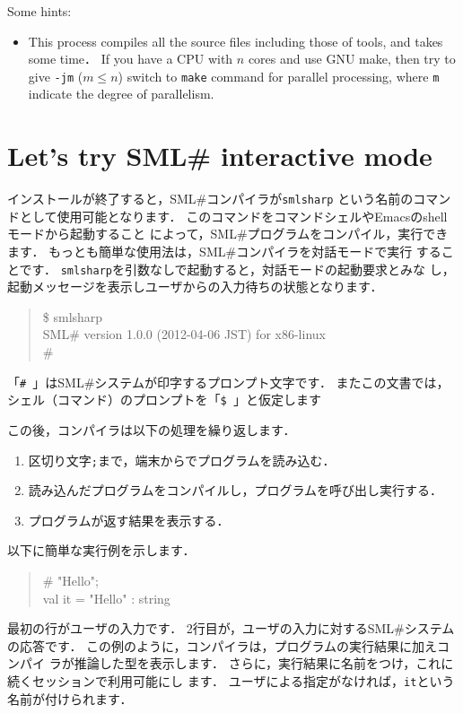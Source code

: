 \documentclass{jbook}
\newcommand{\txt}[2]{#2}
\newcommand{\smlsharp}{SML\#}
\begin{document}
Some hints:
\begin{itemize}
\item 
	This process compiles all the source files including those of
tools, and takes some time．
	If you have a CPU with $n$ cores and use GNU make, then try to
give {\tt -jm} ($m \le n$) switch to {\tt make} command for
parallel processing, where {\tt m} indicate the degree of parallelism. 
\end{itemize}
\fi%

\section{
\txt{\smlsharp{}の対話型モードを使ってみよう}
    {Let's try \smlsharp{} interactive mode}}
\label{sec:tutorialInteractive}
\ifx\jp%

	インストールが終了すると，\smlsharp{}コンパイラが{\tt smlsharp}
という名前のコマンドとして使用可能となります．
	このコマンドをコマンドシェルやEmacsのshellモードから起動すること
によって，\smlsharp{}プログラムをコンパイル，実行できます．
	もっとも簡単な使用法は，\smlsharp{}コンパイラを対話モードで実行
することです．
	{\tt smlsharp}を引数なしで起動すると，対話モードの起動要求とみな
し，起動メッセージを表示しユーザからの入力待ちの状態となります．
\begin{tt}
\begin{quote}
\$ smlsharp\\
SML\# version 1.0.0 (2012-04-06 JST) for x86-linux\\
\# 
\end{quote}
\end{tt}
	「{\tt \#\ }」は\smlsharp{}システムが印字するプロンプト文字です． 
	またこの文書では，シェル（コマンド）のプロンプトを「{\tt \$\ }」と仮定します

	この後，コンパイラは以下の処理を繰り返します．
\begin{enumerate}
\item 区切り文字{\tt ;}まで，端末からでプログラムを読み込む．
\item 読み込んだプログラムをコンパイルし，プログラムを呼び出し実行する．
\item プログラムが返す結果を表示する．
\end{enumerate}
	以下に簡単な実行例を示します．
\begin{tt}
\begin{quote}
\# "Hello";\\
val it = "Hello" : string
\end{quote}
\end{tt}
	最初の行がユーザの入力です．
	2行目が，ユーザの入力に対する\smlsharp{}システムの応答です．
	この例のように，コンパイラは，プログラムの実行結果に加えコンパイ
ラが推論した型を表示します．
	さらに，実行結果に名前をつけ，これに続くセッションで利用可能にし
ます．
	ユーザによる指定がなければ，{\tt it}という名前が付けられます．
\else%
\end{document}
